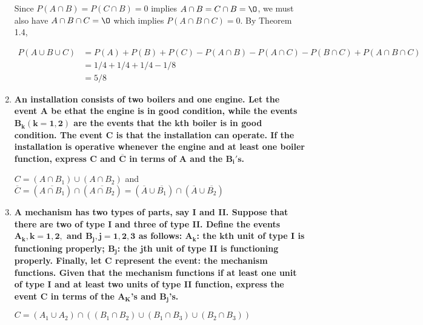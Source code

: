 \documentclass[10pt, oneside]{article}   	%
\theoremstyle{definition}
\begin{document}
\begin{enumerate}[label=1.\arabic*]
Since $P(A \cap B) = P(C \cap B) = 0$ implies $A \cap B = C \cap B = \O$, we must also have $A \cap B \cap C = \O$ which implies $P(A \cap B \cap C) = 0$. By Theorem 1.4,

\begin{align*}
P(A \cup B \cup C) &= P(A) + P(B) + P(C) - P(A \cap B) - P(A \cap C) - P(B \cap C) + P(A \cap B \cap C) \\
&= 1/4 + 1/4 + 1/4 - 1/8 \\
&= \boxed{5/8}
\end{align*}

\item  \begin{tcolorbox}[
  colback=Cerulean!5!white,
  colframe=Cerulean!75!black]
\textbf{An installation consists of two boilers and one engine. Let the event $\bm{A}$ be ethat the engine is in good condition, while the events $\bm{B_k (k = 1, 2)}$ are the events that the $\bm{k}$th boiler is in good condition. The event $\bm{C}$ is that the installation can operate. If the installation is operative whenever the engine and at least one boiler function, express $\bm{C}$ and $\bm{\overline{C}}$ in terms of $\bm{A}$ and the $\bm{B_i's}$.}
\end{tcolorbox}

$\boxed{C = (A \cap B_1) \cup (A \cap B_2)}$ and $\overline{C} = (\overline{A \cap B_1}) \cap (\overline{A \cap B_2}) = \boxed{(\overline{A} \cup \overline{B_1}) \cap (\overline{A} \cup \overline{B_2})}$

\item  \begin{tcolorbox}[
  colback=Cerulean!5!white,
  colframe=Cerulean!75!black]
\textbf{A mechanism has two types of parts, say I and II. Suppose that there are two of type I and three of type II. Define the events $\bm{A_k, k = 1, 2,}$ and $\bm{B_j, j = 1, 2, 3}$ as follows: $\bm{A_k}$: the $\bm{k}$th unit of type I is functioning properly; $\bm{B_j}$: the $\bm{j}$th unit of type II is functioning properly. Finally, let $\bm{C}$ represent the event: the mechanism functions. Given that the mechanism functions if at least one unit of type I and at least two units of type II function, express the event $\bm{C}$ in terms of the $\bm{A_K}$'s and $\bm{B_j}$'s.}
\end{tcolorbox}

$\boxed{C = (A_1 \cup A_2) \cap ((B_1 \cap B_2) \cup (B_1 \cap B_3) \cup (B_2 \cap B_3))}$

\end{enumerate}
\end{document}
